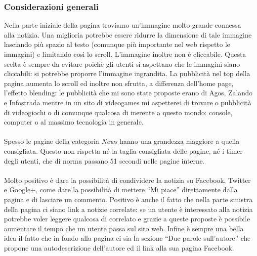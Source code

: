 \documentclass[../ProgettoTecWeb2.tex]{subfiles}
\begin{document}
		\subsubsection{Considerazioni generali}
		Nella parte iniziale della pagina troviamo un'immagine molto grande connessa alla notizia. Una miglioria potrebbe essere ridurre la dimensione di tale immagine lasciando più spazio al testo (comunque più importante nel web rispetto le immagini) e limitando così lo scroll. L'immagine inoltre non è cliccabile. Questa scelta è sempre da evitare poichè gli utenti si aspettano che le immagini siano cliccabili: si potrebbe proporre l'immagine ingrandita. La pubblicità nel top della pagina aumenta lo scroll ed inoltre non sfrutta, a differenza dell'home page, l'effetto blending: le pubblicità che mi sono state proposte erano di Agos, Zalando e Infostrada mentre in un sito di videogames mi aspetterei di trovare o pubblicità di videogiochi o di comunque qualcosa di inerente a questo mondo: console, computer o al massimo tecnologia in generale. 

		\paragraph{}
		Spesso le pagine della categoria \textit{News} hanno una grandezza maggiore a quella consigliata. Questo non rispetta né la taglia consigliata delle pagine, né i timer degli utenti, che di norma passano 51 secondi nelle pagine interne. 

		\paragraph{}
		Molto positivo è dare la possibilità di condividere la notizia su Facebook, Twitter e Google+, come dare la possibilità di mettere ``Mi piace'' direttamente dalla pagina e di lasciare un commento. Positivo è anche il fatto che nella parte sinistra della pagina ci siano link a notizie correlate: se un utente è interessato alla notizia potrebbe voler leggere qualcosa di correlato e grazie a queste proposte è possibile aumentare il tempo che un utente passa sul sito web. Infine è sempre una bella idea il fatto che in fondo alla pagina ci sia la sezione ``Due parole sull'autore'' che propone una autodescrizione dell'autore ed il link alla sua pagina Facebook.

	\newpage
\end{document}
